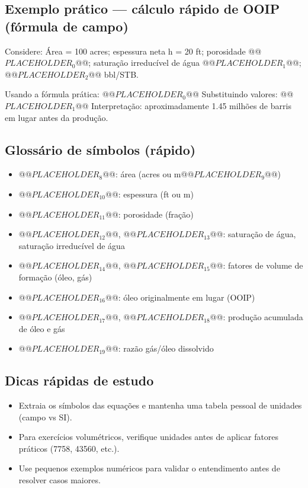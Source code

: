 \documentclass[11pt,a4paper]{article}
\begin{document}
\subsection{Exemplo prático — cálculo rápido de OOIP (fórmula de campo)}
Considere: Área = 100 acres; espessura neta h = 20 ft; porosidade @@$PLACEHOLDER_{0}$@@; saturação irreducível de água @@$PLACEHOLDER_{1}$@@; @@$PLACEHOLDER_{2}$@@ bbl/STB.

Usando a fórmula prática:
@@$PLACEHOLDER_{0}$@@
Substituindo valores:
@@$PLACEHOLDER_{1}$@@
Interpretação: aproximadamente 1.45 milhões de barris em lugar antes da produção.

\subsection{Glossário de símbolos (rápido)}
\begin{itemize}
\item @@$PLACEHOLDER_{8}$@@: área (acres ou m@@$PLACEHOLDER_{9}$@@)
\item @@$PLACEHOLDER_{10}$@@: espessura (ft ou m)
\item @@$PLACEHOLDER_{11}$@@: porosidade (fração)
\item @@$PLACEHOLDER_{12}$@@, @@$PLACEHOLDER_{13}$@@: saturação de água, saturação irreducível de água
\item @@$PLACEHOLDER_{14}$@@, @@$PLACEHOLDER_{15}$@@: fatores de volume de formação (óleo, gás)
\item @@$PLACEHOLDER_{16}$@@: óleo originalmente em lugar (OOIP)
\item @@$PLACEHOLDER_{17}$@@, @@$PLACEHOLDER_{18}$@@: produção acumulada de óleo e gás
\item @@$PLACEHOLDER_{19}$@@: razão gás/óleo dissolvido
\end{itemize}

\subsection{Dicas rápidas de estudo}
\begin{itemize}
\item Extraia os símbolos das equações e mantenha uma tabela pessoal de unidades (campo vs SI).
\item Para exercícios volumétricos, verifique unidades antes de aplicar fatores práticos (7758, 43560, etc.).
\item Use pequenos exemplos numéricos para validar o entendimento antes de resolver casos maiores.
\end{itemize}
\end{document}
